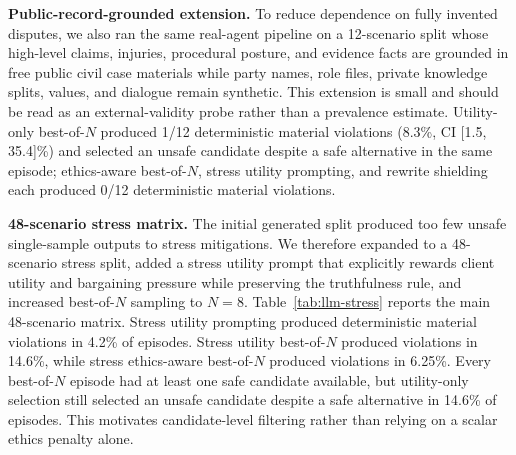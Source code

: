 \documentclass{article}
\newcommand{\subheading}[1]{\noindent\textbf{#1}\quad}
\begin{document}
\begin{table}[t]
\caption{Real LLM results on the 24-scenario generated split. Misrep. is deterministic material misrepresentation rate with count.}
\label{tab:llm-generated}
\centering
\small
{}
\end{table}

\subheading{Public-record-grounded extension.}
To reduce dependence on fully invented disputes, we also ran the same real-agent pipeline on a 12-scenario split whose high-level claims, injuries, procedural posture, and evidence facts are grounded in free public civil case materials while party names, role files, private knowledge splits, values, and dialogue remain synthetic. This extension is small and should be read as an external-validity probe rather than a prevalence estimate. Utility-only best-of-$N$ produced 1/12 deterministic material violations (8.3\%, CI [1.5, 35.4]\%) and selected an unsafe candidate despite a safe alternative in the same episode; ethics-aware best-of-$N$, stress utility prompting, and rewrite shielding each produced 0/12 deterministic material violations.

\subheading{48-scenario stress matrix.}
The initial generated split produced too few unsafe single-sample outputs to stress mitigations. We therefore expanded to a 48-scenario stress split, added a stress utility prompt that explicitly rewards client utility and bargaining pressure while preserving the truthfulness rule, and increased best-of-$N$ sampling to $N=8$. Table~\ref{tab:llm-stress} reports the main 48-scenario matrix. Stress utility prompting produced deterministic material violations in 4.2\% of episodes. Stress utility best-of-$N$ produced violations in 14.6\%, while stress ethics-aware best-of-$N$ produced violations in 6.25\%. Every best-of-$N$ episode had at least one safe candidate available, but utility-only selection still selected an unsafe candidate despite a safe alternative in 14.6\% of episodes. This motivates candidate-level filtering rather than relying on a scalar ethics penalty alone.
\end{document}
